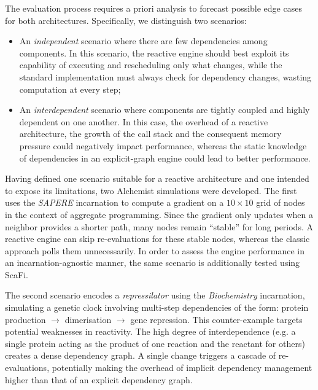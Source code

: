 The evaluation process requires a priori analysis to forecast possible edge
cases for both architectures. Specifically, we distinguish two scenarios:
\begin{itemize}
	\item An \emph{independent} scenario where there are few dependencies among
	      components. In this scenario, the reactive engine should best exploit
	      its capability of executing and rescheduling only what changes, while
	      the standard implementation must always check for dependency changes,
	      wasting computation at every step;
	\item An \emph{interdependent} scenario where components are tightly
	      coupled and highly dependent on one another. In this case, the overhead
	      of a reactive architecture, the growth of the call stack and the
	      consequent memory pressure could negatively impact performance, whereas
	      the static knowledge of dependencies in an explicit-graph engine could
	      lead to better performance.
\end{itemize}

Having defined one scenario suitable for a reactive architecture and one
intended to expose its limitations, two Alchemist simulations were developed.
The first uses the \emph{SAPERE} incarnation to compute a gradient on a
$10\times 10$ grid of nodes in the context of aggregate programming. Since the
gradient only updates when a neighbor provides a shorter path, many nodes
remain ``stable'' for long periods. A reactive engine can skip re-evaluations
for these stable nodes, whereas the classic approach polls them unnecessarily.
In order to assess the engine performance in an incarnation-agnostic manner,
the same scenario is additionally tested using ScaFi.

The second scenario encodes a \emph{repressilator} using the
\emph{Biochemistry} incarnation, simulating a genetic clock involving
multi-step dependencies of the form: protein production $\to$ dimerisation
$\to$ gene repression. This counter-example targets potential weaknesses in
reactivity. The high degree of interdependence (e.g. a single protein acting as
the product of one reaction and the reactant for others) creates a dense
dependency graph. A single change triggers a cascade of re-evaluations,
potentially making the overhead of implicit dependency management higher than
that of an explicit dependency graph.

